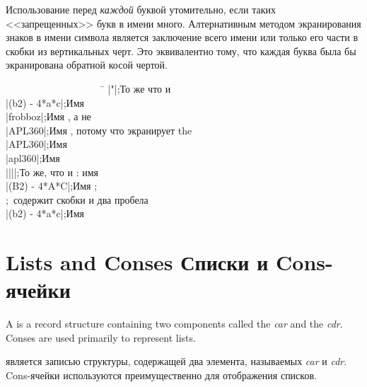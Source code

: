 Использование \cd{{\Xbackslash}} перед {\it каждой} буквой утомительно, если
таких <<запрещенных>> букв в имени много. Алтернативным методом экранирования
знаков в имени символа является заключение всего имени или только его части в
скобки из вертикальных черт. Это эквивалентно тому, что каждая буква была бы
экранирована обратной косой чертой.
\begin{lisp}
~~~~~~~~~~~~~~~~~~~~\=\kill
|"|\>;{\rm То же что и } \\
|(b{\Xcircumflex}2) - 4*a*c|\>;{\rm Имя } \\
|frobboz|\>;{\rm Имя , а не } \\
|APL{\Xbackslash}360|\>;{\rm Имя , потому что \cd{{\Xbackslash}} экранирует the } \\
|APL{\Xbackslash}{\Xbackslash}360|\>;{\rm Имя } \\
|apl{\Xbackslash}{\Xbackslash}360|\>;{\rm Имя } \\
|{\Xbackslash}|{\Xbackslash}||\>;{\rm То же, что и \cd{{\Xbackslash}|{\Xbackslash}|}: имя \cd{||}} \\
|(B{\Xcircumflex}2) - 4*A*C|\>;{\rm Имя ;} \\
\>;~{\rm содержит скобки и два пробела} \\
|(b{\Xcircumflex}2) - 4*a*c|\>;{\rm Имя }
\end{lisp}


\section{Lists and Conses Списки и Cons-ячейки}

A  is a record structure containing two components
called the {\it car} and the {\it cdr}.  Conses are used primarily
to represent lists.

 является записью структуры, содержащей два элемента, называемых
{\it car} и {\it cdr}. Cons-ячейки используются преимущественно для отображения
списков.

